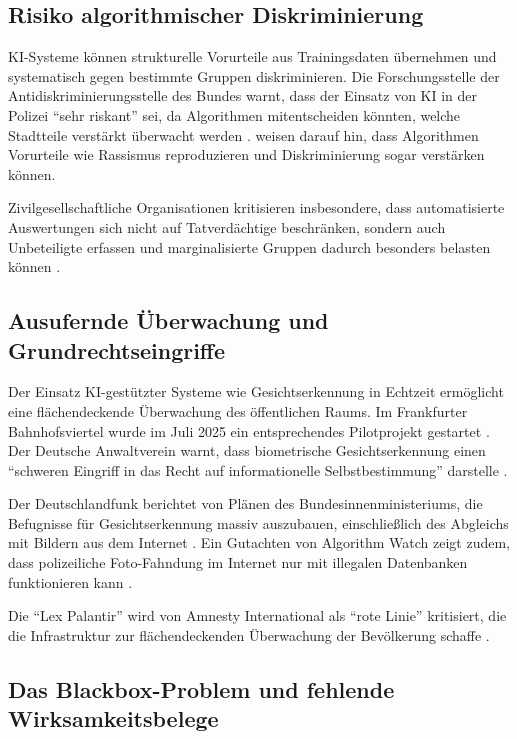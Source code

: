\documentclass[12pt,a4paper]{article}
\begin{document}
	\subsection{Risiko algorithmischer Diskriminierung}
	
	KI-Systeme können strukturelle Vorurteile aus Trainingsdaten übernehmen und systematisch gegen bestimmte Gruppen diskriminieren. Die Forschungsstelle der Antidiskriminierungsstelle des Bundes warnt, dass der Einsatz von KI in der Polizei \enquote{sehr riskant} sei, da Algorithmen mitentscheiden könnten, welche Stadtteile verstärkt überwacht werden \cite{Antidisk2025}. \cite{taz2026} weisen darauf hin, dass Algorithmen Vorurteile wie Rassismus reproduzieren und Diskriminierung sogar verstärken können.
	
	Zivilgesellschaftliche Organisationen kritisieren insbesondere, dass automatisierte Auswertungen sich nicht auf Tatverdächtige beschränken, sondern auch Unbeteiligte erfassen und marginalisierte Gruppen dadurch besonders belasten können \cite{Netzpolitik2025}.
	
	\subsection{Ausufernde Überwachung und Grundrechtseingriffe}
	
	Der Einsatz KI-gestützter Systeme wie Gesichtserkennung in Echtzeit ermöglicht eine flächendeckende Überwachung des öffentlichen Raums. Im Frankfurter Bahnhofsviertel wurde im Juli 2025 ein entsprechendes Pilotprojekt gestartet \cite{TOnline2025}. Der Deutsche Anwaltverein warnt, dass biometrische Gesichtserkennung einen \enquote{schweren Eingriff in das Recht auf informationelle Selbstbestimmung} darstelle \cite{DAV2025}.
	
	Der Deutschlandfunk berichtet von Plänen des Bundesinnenministeriums, die Befugnisse für Gesichtserkennung massiv auszubauen, einschließlich des Abgleichs mit Bildern aus dem Internet \cite{DLF2025}. Ein Gutachten von Algorithm Watch zeigt zudem, dass polizeiliche Foto-Fahndung im Internet nur mit illegalen Datenbanken funktionieren kann \cite{taz2025}.
	
	Die \enquote{Lex Palantir} wird von Amnesty International als \enquote{rote Linie} kritisiert, die die Infrastruktur zur flächendeckenden Überwachung der Bevölkerung schaffe \cite{Amnesty2026}.
	
	\subsection{Das Blackbox-Problem und fehlende Wirksamkeitsbelege}
	
\end{document}
